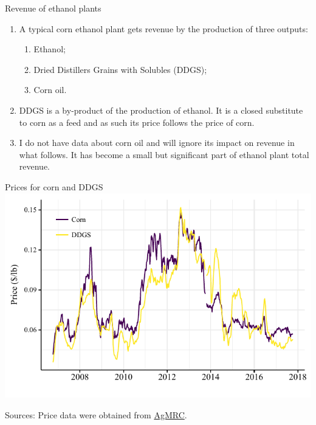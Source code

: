 \documentclass[table,xcolor=pdftex,dvipsnames]{beamer}\usepackage[]{graphicx}\usepackage[]{color}
\makeatletter
\def\maxwidth{ %
  \ifdim\Gin@nat@width>\linewidth
    \linewidth
  \else
    \Gin@nat@width
  \fi
}
\newenvironment{knitrout}{}{} %
\makeatother
\begin{document}
\begin{frame}{Revenue of ethanol plants}
\begin{enumerate}[label=\textbullet]
    \item A typical corn ethanol plant gets revenue by the production of three outputs:
    \begin{enumerate}[label=-]
        \item Ethanol;
        \item Dried Distillers Grains with Solubles (DDGS);
        \item Corn oil.
    \end{enumerate}
    \item DDGS is a by-product of the production of ethanol. It is a closed substitute to corn as a feed and as such its price follows the price of corn.
    \item I do not have data about corn oil and will ignore its impact on revenue in what follows. It has become a small but significant part of ethanol plant total revenue.
\end{enumerate}
\end{frame}



\begin{frame}{Prices for corn and DDGS}
\begin{knitrout}
\color{fgcolor}
\includegraphics[width=\maxwidth]{figure/figure_ddgs-1} 

\end{knitrout}
\vspace{-1\baselineskip}
Sources: Price data were obtained from \href{http://www.extension.iastate.edu/agdm/energy/xls/agmrcethanolplantprices.xlsx}{AgMRC}.
\end{frame}
\end{document}

